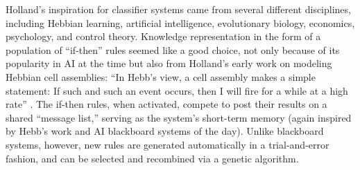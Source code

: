 \documentclass{sig-alternate}
\begin{document}




Holland's inspiration for classifier systems came from several
different disciplines, including Hebbian
learning, artificial intelligence, evolutionary biology, economics,
psychology, and control theory.
Knowledge representation in the form of a population of ``if-then''
rules seemed like a good choice, not only because of its popularity in
AI at the time but also from Holland's early work on modeling Hebbian
cell assemblies: ``In Hebb's view, a cell assembly makes a simple
statement: If such and such an event occurs, then I will fire for a
while at a high rate'' \cite{Waldrop1993}.  The if-then rules, when
activated, compete to post their results on a shared ``message list,''
serving as the system's short-term memory (again inspired by Hebb's
work and AI blackboard systems of the day).  Unlike blackboard
systems, however, new rules are generated automatically in a
trial-and-error fashion, and can be selected and recombined via a
genetic algorithm.
\end{document}
